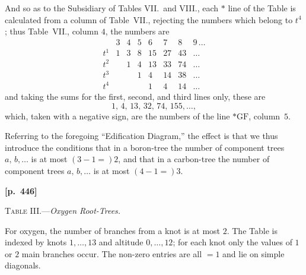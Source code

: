 \documentclass[11pt,a4paper]{article}
\providecommand{\GF}{\mathrm{GF}}
\begin{document}
And so as to the Subsidiary of Tables VII.\ and VIII., each $*$ line of the Table is calculated from a column of Table~VII., rejecting the numbers which belong to $t^{4}$; thus Table~VII., column $4$, the numbers are
\[
\begin{array}{l|ccccccc}
& 3 & 4 & 5 & 6 & 7 & 8 & 9\,\ldots\\\hline
t^{1} & 1 & 3 & 8 & 15 & 27 & 43 & \ldots\\
t^{2} & & 1 & 4 & 13 & 33 & 74 & \ldots\\
t^{3} & & & 1 & 4 & 14 & 38 & \ldots\\
t^{4} & & & & 1 & 4 & 14 & \ldots
\end{array}
\]
and taking the sums for the first, second, and third lines only, these are
\[
1,\,4,\,13,\,32,\,74,\,155,\ldots,
\]
which, taken with a negative sign, are the numbers of the line $*\GF$, column~$5$.

Referring to the foregoing ``Edification Diagram,'' the effect is that we thus introduce the conditions that in a boron-tree the number of component trees $a,\,b,\ldots$ is at most $(3-1=)2$, and that in a carbon-tree the number of component trees $a,\,b,\ldots$ is at most $(4-1=)3$.

\newpage
\noindent\textbf{[p.~446]}\quad
\begin{center}
\textsc{Table III.}\quad---\quad\textit{Oxygen Root-Trees.}
\end{center}

\noindent For oxygen, the number of branches from a knot is at most $2$. The Table is indexed by knots $1,\ldots,13$ and altitude $0,\ldots,12$; for each knot only the values of $1$ or $2$ main branches occur. The non-zero entries are all $=1$ and lie on simple diagonals.

\medskip
\end{document}
